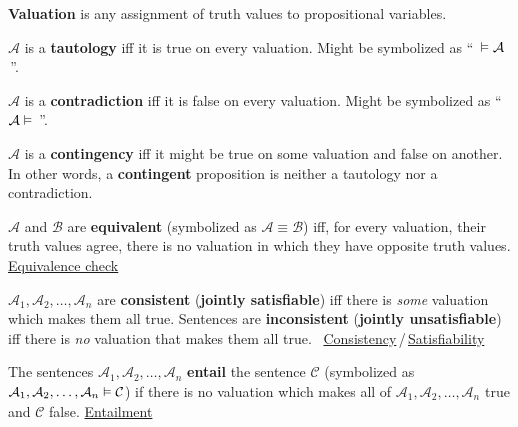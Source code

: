 \documentclass[a4paper,10pt]{article}
\begin{document}
\begin{terms}
    \item \textbf{Valuation} is any assignment of truth values to propositional variables.

    \item $\mathcal{A}$ is a \textbf{tautology} iff it is true on every valuation. Might be symbolized as \enquote{\,${} \vDash \mathcal{A}$\,}.

    \item $\mathcal{A}$ is a \textbf{contradiction} iff it is false on every valuation. Might be symbolized as \enquote{\,$\mathcal{A} \vDash {}$\,}.

    \item $\mathcal{A}$ is a \textbf{contingency} iff it might be true on some valuation and false on another. In other words, a \textbf{contingent} proposition is neither a tautology nor a contradiction.

    \item $\mathcal{A}$ and $\mathcal{B}$ are \textbf{equivalent} (symbolized as $\mathcal{A} \equiv \mathcal{B}$) iff, for every valuation, their truth values agree, \ie there is no valuation in which they have opposite truth values.
    \hfill\href{https://en.wikipedia.org/wiki/Formal_equivalence_checking}{Equivalence check}

    \item $\mathcal{A}_1, \mathcal{A}_2, \dotsc, \mathcal{A}_n$ are \textbf{consistent} (\textbf{jointly satisfiable}) iff there is \emph{some} valuation which makes them all true. Sentences are \textbf{inconsistent} (\textbf{jointly unsatisfiable}) iff there is \emph{no} valuation that makes them all true.
    ~\hfill\href{https://en.wikipedia.org/wiki/Consistency}{Consistency}\,/\,\href{https://en.wikipedia.org/wiki/Satisfiability}{Satisfiability}

    \item The sentences $\mathcal{A}_1, \mathcal{A}_2, \dotsc, \mathcal{A}_n$ \textbf{entail} the sentence $\mathcal{C}$ (symbolized as $\mathcal{A}_1, \mathcal{A}_2, \dotsc, \mathcal{A}_n \vDash \mathcal{C}$) if there is no valuation which makes all of $\mathcal{A}_1, \mathcal{A}_2, \dotsc, \mathcal{A}_n$ true and $\mathcal{C}$ false.
    \hfill\href{https://en.wikipedia.org/wiki/Entailment}{Entailment}


\end{terms}
\end{document}
